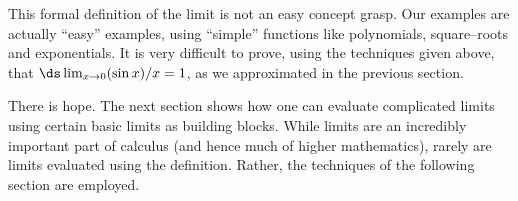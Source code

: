 This formal definition of the limit is not an easy concept grasp. Our examples are actually ``easy'' examples, using ``simple'' functions like polynomials, square--roots and exponentials. It is very difficult to prove, using the techniques given above, that $\ds \lim_{x\to 0}(\sin x)/x = 1$, as we approximated in the previous section.

There is hope. The next section shows how one can evaluate complicated limits using certain basic limits as building blocks. While limits are an incredibly important part of calculus (and hence much of higher mathematics), rarely are limits evaluated using the definition. Rather, the techniques of the following section are employed.

